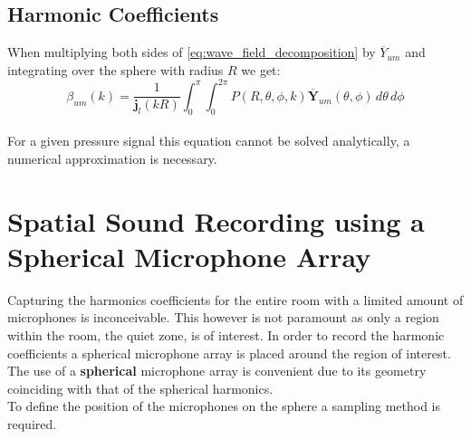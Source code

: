 \subsection{Harmonic Coefficients}
When multiplying both sides of \ref{eq:wave_field_decomposition} by $\overline Y_{um}$ and integrating over the sphere with radius $R$ we get\cite{Chen2017}:\\
\begin{equation}
    {\beta_{um}(k) = \frac{1}{\mathbf j_l(kR)}\int_0^\pi\int_0^{2\pi}P(R,\theta,\phi,k) \overline {\mathbf{Y}}_{um}(\theta,\phi)\,d\theta\, d\phi}
    \label{eq:harmonic_coefficients}
\end{equation}\\
For a given pressure signal this equation cannot be solved analytically, a numerical approximation is necessary.
\section{Spatial Sound Recording using a Spherical Microphone Array}
Capturing the harmonics coefficients for the entire room with a limited amount of microphones is inconceivable. This however is not paramount as only a region within the room, the quiet zone, is of interest. In order to record the harmonic coefficients a spherical microphone array is placed around the region of interest. The use of a \textbf{spherical} microphone array is convenient due to its geometry coinciding with that of the spherical harmonics\cite{Chen2017}.\\
To define the position of the microphones on the sphere a sampling method is required.
